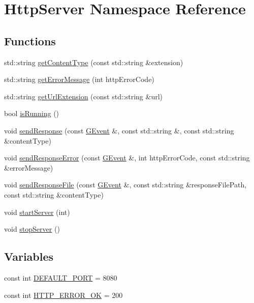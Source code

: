 \hypertarget{namespaceHttpServer}{}\section{Http\+Server Namespace Reference}
\label{namespaceHttpServer}
\subsection*{Functions}
\begin{DoxyCompactItemize}
\item 
std\+::string \mbox{\hyperlink{namespaceHttpServer_ac6f7f384cb8cf20d5d04518a080c45a0}{get\+Content\+Type}} (const std\+::string \&extension)
\item 
std\+::string \mbox{\hyperlink{namespaceHttpServer_a185aa863644e8757a66967ff36b6935c}{get\+Error\+Message}} (int http\+Error\+Code)
\item 
std\+::string \mbox{\hyperlink{namespaceHttpServer_abf169666c2d4abcd31ea765851c24da5}{get\+Url\+Extension}} (const std\+::string \&url)
\item 
bool \mbox{\hyperlink{namespaceHttpServer_a40e5881f9c001c5cc38554084751adbc}{is\+Running}} ()
\item 
void \mbox{\hyperlink{namespaceHttpServer_ab52918227ce3e9fc7307919ec5cfb8c4}{send\+Response}} (const \mbox{\hyperlink{classGEvent}{G\+Event}} \&, const std\+::string \&, const std\+::string \&content\+Type)
\item 
void \mbox{\hyperlink{namespaceHttpServer_aa02b158d679b621a57424226abddb2f3}{send\+Response\+Error}} (const \mbox{\hyperlink{classGEvent}{G\+Event}} \&, int http\+Error\+Code, const std\+::string \&error\+Message)
\item 
void \mbox{\hyperlink{namespaceHttpServer_a7aa441bd496891daac42c3c0a9d2b04c}{send\+Response\+File}} (const \mbox{\hyperlink{classGEvent}{G\+Event}} \&, const std\+::string \&response\+File\+Path, const std\+::string \&content\+Type)
\item 
void \mbox{\hyperlink{namespaceHttpServer_ad9ce372cd1d3cf5d927b561f622b9506}{start\+Server}} (int)
\item 
void \mbox{\hyperlink{namespaceHttpServer_ac1e551c19cd6ce8d7da8b13d1f290863}{stop\+Server}} ()
\end{DoxyCompactItemize}
\subsection*{Variables}
\begin{DoxyCompactItemize}
\item 
const int \mbox{\hyperlink{namespaceHttpServer_a610f3f15565288af94817eb21fea9d13}{D\+E\+F\+A\+U\+L\+T\+\_\+\+P\+O\+RT}} = 8080
\item 
const int \mbox{\hyperlink{namespaceHttpServer_aa295687b87097373f5603b5138a9e07e}{H\+T\+T\+P\+\_\+\+E\+R\+R\+O\+R\+\_\+\+OK}} = 200
\end{DoxyCompactItemize}


